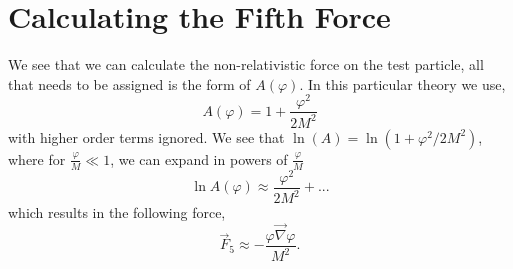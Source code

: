 \section{Calculating the Fifth Force}
We see that we can calculate the non-relativistic force on the test particle, all that needs to be assigned is the form of $A(\varphi)$. In this particular theory we use, 
\begin{equation}
    A(\varphi) = 1 + \frac{\varphi^2}{2M^2}
\end{equation}
with higher order terms ignored. We see that $\ln(A) = \ln(1 + \varphi^2/2M^2)$, where for $\frac{\varphi}{M}\ll 1$, we can expand in powers of $\frac{\varphi}{M}$
\begin{equation}
    \ln A(\varphi)\approx \frac{\varphi^2}{2M^2}+...
\end{equation}
which results in the following force,
\begin{equation}
    \vec{F}_5 \approx - \frac{\varphi\vec{\nabla}\varphi}{M^2}.
\end{equation}



